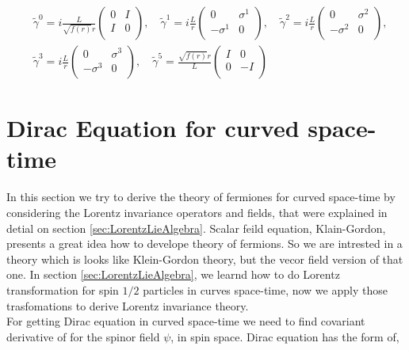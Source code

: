 \begin{align} \label{eq:GammaMetricesMinkowski5d}
   &\tilde{\gamma}^0 = i\frac{L}{\sqrt{f(r)}r}\begin{pmatrix} 0 & I \\ I & 0 \\ \end{pmatrix}, \quad
   \tilde{\gamma}^1  = i\frac{L}{r}\begin{pmatrix} 0 & \sigma^1 \\ -\sigma^1 & 0 \\ \end{pmatrix}, \quad
   \tilde{\gamma}^2  = i\frac{L}{r}\begin{pmatrix} 0 & \sigma^2 \\ -\sigma^2 & 0 \\ \end{pmatrix}, \nonumber\\
   &\tilde{\gamma}^3 = i\frac{L}{r}\begin{pmatrix} 0 & \sigma^3 \\ -\sigma^3 & 0 \\ \end{pmatrix}, \quad
   \tilde{\gamma}^5  =  \frac{\sqrt{f(r)}r}{L}\begin{pmatrix} I & 0 \\ 0 & -I \\ \end{pmatrix}
\end{align}

\section{Dirac Equation for curved space-time}

In this section we try to derive the theory of fermiones for curved space-time by considering the Lorentz invariance operators and fields, that were explained in detial on section \ref{sec:LorentzLieAlgebra}. Scalar feild equation, Klain-Gordon, presents a great idea how to develope theory of fermions. So we are intrested in a theory which is looks like Klein-Gordon theory, but the vecor field version of that one. In section \ref{sec:LorentzLieAlgebra}, we learnd how to do Lorentz transformation for spin $1/2$ particles in curves space-time, now we apply those trasfomations to derive Lorentz invariance theory.\\

For getting Dirac equation in curved space-time we need to find covariant derivative of for the spinor field $\psi$, in spin space. Dirac equation has the form of,

